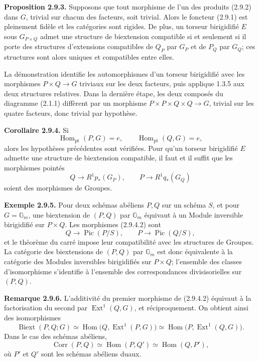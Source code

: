 \documentclass[11pt]{article}
\providecommand{\Pic}{\operatorname{Pic}}
\providecommand{\Ext}{\operatorname{Ext}}
\providecommand{\Biext}{\operatorname{Biext}}
\providecommand{\Corr}{\operatorname{Corr}}
\begin{document}
\textbf{Proposition 2.9.3.}  Supposons que tout morphisme de l'un des produits (2.9.2) dans \(G\), trivial sur chacun des facteurs, soit trivial.  Alors le foncteur (2.9.1) est pleinement fidèle et les catégories sont rigides.  De plus, un torseur birigidifié \(E\) sous \(G_{P\times Q}\) admet une structure de biextension compatible si et seulement si il porte des structures d'extensions compatibles de \(Q_P\) par \(G_P\) et de \(P_Q\) par \(G_Q\); ces structures sont alors uniques et compatibles entre elles.

La démonstration identifie les automorphismes d'un torseur birigidifié avec les morphismes \(P\times Q\to G\) triviaux sur les deux facteurs, puis applique 1.3.5 aux deux structures relatives.  Dans la dernière étape, les deux composés du diagramme (2.1.1) diffèrent par un morphisme \(P\times P\times Q\times Q\to G\), trivial sur les quatre facteurs, donc trivial par hypothèse.

\textbf{Corollaire 2.9.4.}  Si
\begin{equation}\tag{2.9.4.1}
  \operatorname{Hom}_{\mathrm{pt}}(P,G)=e,
  \qquad
  \operatorname{Hom}_{\mathrm{pt}}(Q,G)=e,
\end{equation}
alors les hypothèses précédentes sont vérifiées.  Pour qu'un torseur birigidifié \(E\) admette une structure de biextension compatible, il faut et il suffit que les morphismes pointés
\begin{equation}\tag{2.9.4.2}
  Q\longrightarrow R^1p_*(G_P),
  \qquad
  P\longrightarrow R^1q_*(G_Q)
\end{equation}
soient des morphismes de Groupes.

\textbf{Exemple 2.9.5.}  Pour deux schémas abéliens \(P,Q\) sur un schéma \(S\), et pour \(G=\mathbb G_m\), une biextension de \((P,Q)\) par \(\mathbb G_m\) équivaut à un Module inversible birigidifié sur \(P\times Q\).  Les morphismes (2.9.4.2) sont
\begin{equation}\tag{2.9.5.1}
  Q\longrightarrow \Pic(P/S),
  \qquad
  P\longrightarrow \Pic(Q/S),
\end{equation}
et le théorème du carré impose leur compatibilité avec les structures de Groupes.  La catégorie des biextensions de \((P,Q)\) par \(\mathbb G_m\) est donc équivalente à la catégorie des Modules inversibles birigidifiés sur \(P\times Q\); l'ensemble des classes d'isomorphisme s'identifie à l'ensemble des correspondances divisisorielles sur \((P,Q)\).

\textbf{Remarque 2.9.6.}  L'additivité du premier morphisme de (2.9.4.2) équivaut à la factorisation du second par \(\Ext^1(Q,G)\), et réciproquement.  On obtient ainsi des isomorphismes
\begin{equation}\tag{2.9.6.1}
  \Biext(P,Q;G)
  \simeq\operatorname{Hom}\bigl(Q,\Ext^1(P,G)\bigr)
  \simeq\operatorname{Hom}\bigl(P,\Ext^1(Q,G)\bigr).
\end{equation}
Dans le cas des schémas abéliens,
\begin{equation}\tag{2.9.6.2}
  \Corr(P,Q)\simeq\operatorname{Hom}(P,Q')\simeq\operatorname{Hom}(Q,P'),
\end{equation}
où \(P'\) et \(Q'\) sont les schémas abéliens duaux.
\end{document}
